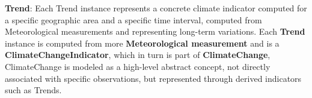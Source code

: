 \textbf{Trend}: Each Trend instance represents a concrete climate indicator
computed for a specific geographic area and a specific time interval, computed from Meteorological measurements and representing
long-term variations. Each \textbf{Trend} instance is computed from more \textbf{Meteorological measurement} and is a
\textbf{ClimateChangeIndicator}, which in turn is part of \textbf{ClimateChange}, ClimateChange is modeled as a high-level
abstract concept, not directly associated with specific observations, but represented through derived indicators such as Trends.

